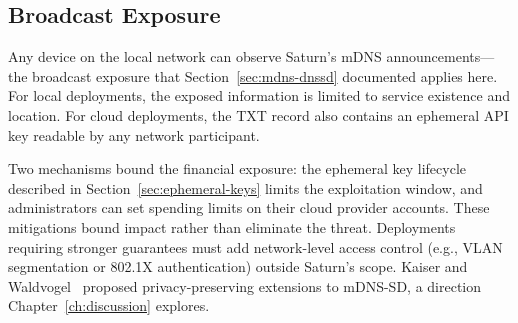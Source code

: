 \subsection{Broadcast Exposure}
\label{sec:broadcast-exposure}

Any device on the local network can observe Saturn's mDNS announcements---the broadcast exposure that Section~\ref{sec:mdns-dnssd} documented applies here. For local deployments, the exposed information is limited to service existence and location. For cloud deployments, the TXT record also contains an ephemeral API key readable by any network participant.

Two mechanisms bound the financial exposure: the ephemeral key lifecycle described in Section~\ref{sec:ephemeral-keys} limits the exploitation window, and administrators can set spending limits on their cloud provider accounts. These mitigations bound impact rather than eliminate the threat. Deployments requiring stronger guarantees must add network-level access control (e.g., VLAN segmentation or 802.1X authentication) outside Saturn's scope. Kaiser and Waldvogel~\cite{kaiser2014efficient} proposed privacy-preserving extensions to mDNS-SD, a direction Chapter~\ref{ch:discussion} explores.
